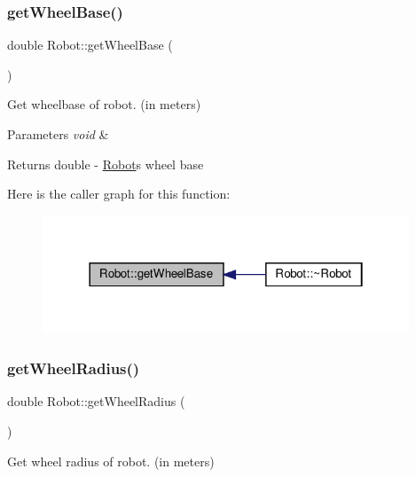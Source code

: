\subsubsection{\texorpdfstring{get\+Wheel\+Base()}{getWheelBase()}}
{\footnotesize\ttfamily double Robot\+::get\+Wheel\+Base (\begin{DoxyParamCaption}{ }\end{DoxyParamCaption})}



Get wheelbase of robot. (in meters) 


\begin{DoxyParams}{Parameters}
{\em void} & \\
\hline
\end{DoxyParams}
\begin{DoxyReturn}{Returns}
double -\/ \hyperlink{classRobot}{Robot}\textquotesingle{}s wheel base 
\end{DoxyReturn}
Here is the caller graph for this function\+:
\nopagebreak
\begin{figure}[H]
\begin{center}
\leavevmode
\includegraphics[width=310pt]{classRobot_a31e2ab259ea221e1143141ee7765a8e2_icgraph}
\end{center}
\end{figure}
\mbox{\label{classRobot_a419b324c8db1f6e7e1dd65b5a15f3049}} 
\subsubsection{\texorpdfstring{get\+Wheel\+Radius()}{getWheelRadius()}}
{\footnotesize\ttfamily double Robot\+::get\+Wheel\+Radius (\begin{DoxyParamCaption}{ }\end{DoxyParamCaption})}



Get wheel radius of robot. (in meters) 


